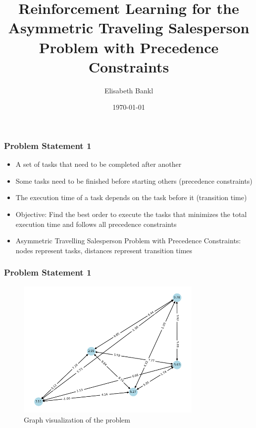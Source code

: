 \documentclass{beamer}
\title{Reinforcement Learning for the Asymmetric Traveling Salesperson Problem with Precedence Constraints}
\author{Elisabeth Bankl}
\date{\today}
\begin{document}
\frame{\titlepage}



\begin{frame}
    \frametitle{Problem Statement 1}
    \begin{itemize}
        \item A set of tasks that need to be completed after another
        \item Some tasks need to be finished before starting others (precedence constraints)
        \item The execution time of a task depends on the task before it (transition time)
        \item Objective: Find the best order to execute the tasks that minimizes the total execution time and follows all precedence constraints
        \item Asymmetric Travelling Salesperson Problem with Precedence Constraints: nodes represent tasks, distances represent transition times
    \end{itemize}
   

\end{frame}

\begin{frame}
    \frametitle{Problem Statement 1}
    \begin{figure}
        \centering
        \includegraphics[width=0.8\textwidth]{graph_visualization.png}
        \caption{Graph visualization of the problem}
    \end{figure}

\end{frame}
\end{document}
